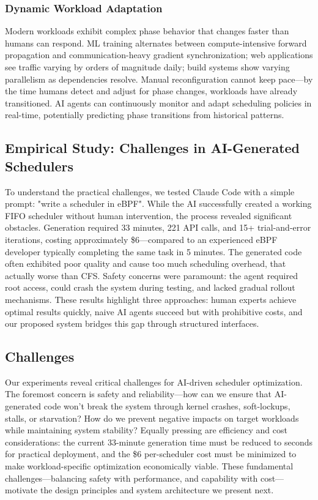 \subsubsection{Dynamic Workload Adaptation}

Modern workloads exhibit complex phase behavior that changes faster than humans can respond. ML training alternates between compute-intensive forward propagation and communication-heavy gradient synchronization; web applications see traffic varying by orders of magnitude daily; build systems show varying parallelism as dependencies resolve. Manual reconfiguration cannot keep pace—by the time humans detect and adjust for phase changes, workloads have already transitioned. AI agents can continuously monitor and adapt scheduling policies in real-time, potentially predicting phase transitions from historical patterns.

\subsection{Empirical Study: Challenges in AI-Generated Schedulers}

To understand the practical challenges, we tested Claude Code with a simple prompt: "write a scheduler in eBPF". While the AI successfully created a working FIFO scheduler without human intervention, the process revealed significant obstacles. Generation required 33 minutes, 221 API calls, and 15+ trial-and-error iterations, costing approximately \$6—compared to an experienced eBPF developer typically completing the same task in 5 minutes. The generated code often exhibited poor quality and cause too much scheduling overhead, that actually worse than CFS. Safety concerns were paramount: the agent required root access, could crash the system during testing, and lacked gradual rollout mechanisms. These results highlight three approaches: human experts achieve optimal results quickly, naive AI agents succeed but with prohibitive costs, and our proposed system bridges this gap through structured interfaces.

\subsection{Challenges}

Our experiments reveal critical challenges for AI-driven scheduler optimization. The foremost concern is safety and reliability—how can we ensure that AI-generated code won't break the system through kernel crashes, soft-lockups, stalls, or starvation? How do we prevent negative impacts on target workloads while maintaining system stability? Equally pressing are efficiency and cost considerations: the current 33-minute generation time must be reduced to seconds for practical deployment, and the \$6 per-scheduler cost must be minimized to make workload-specific optimization economically viable. These fundamental challenges—balancing safety with performance, and capability with cost—motivate the design principles and system architecture we present next.